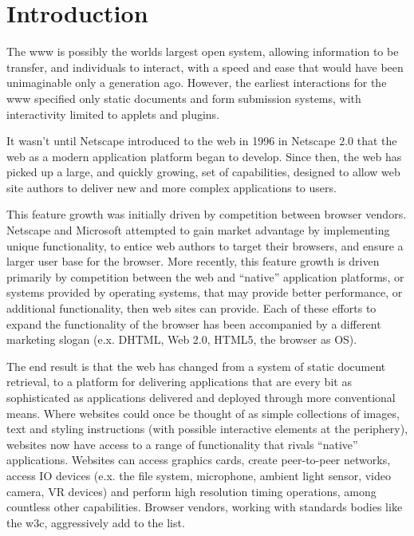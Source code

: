 \chapter{Introduction}

The \gls{www} is possibly the worlds largest open system, allowing information
to be transfer, and individuals to interact, with a speed and ease that would
have been unimaginable only a generation ago.  However, the earliest interactions
for the \gls{www} specified only static documents and form submission systems,
with interactivity limited to applets and plugins.

It wasn't until Netscape introduced \JS to the web in 1996 in Netscape 2.0
that the web as a modern application platform began to develop. Since then,
the web has picked up a large, and quickly growing, set of capabilities,
designed to allow web site authors to deliver new and more complex applications
to users.

This feature growth was initially driven by competition between
browser vendors.  Netscape and Microsoft attempted to gain market advantage
by implementing unique functionality, to entice web authors
to target their browsers, and ensure a larger user base for the browser.
More recently, this feature growth is driven primarily by competition between the
web and ``native'' application platforms, or systems provided by operating
systems, that may provide better performance, or additional functionality, then
web sites can provide.  Each of these efforts to expand the functionality
of the browser has been accompanied by a different marketing slogan (e.x.
DHTML, Web 2.0, HTML5, the browser as OS).

The end result is that the web has changed from a system of static document
retrieval, to a platform for delivering applications that are every bit
as sophisticated as applications delivered and deployed through more
conventional means.  Where websites could once be thought of as simple
collections of images, text and styling instructions (with possible
interactive elements at the periphery), websites now have access to a
range of functionality that rivals ``native'' applications.  Websites can
access graphics cards, create peer-to-peer networks, access IO devices
(e.x. the file system, microphone, ambient light sensor, video camera, VR
devices) and perform high resolution timing operations, among countless other
capabilities.  Browser vendors, working with standards bodies like the \gls{w3c},
aggressively add to the list.

